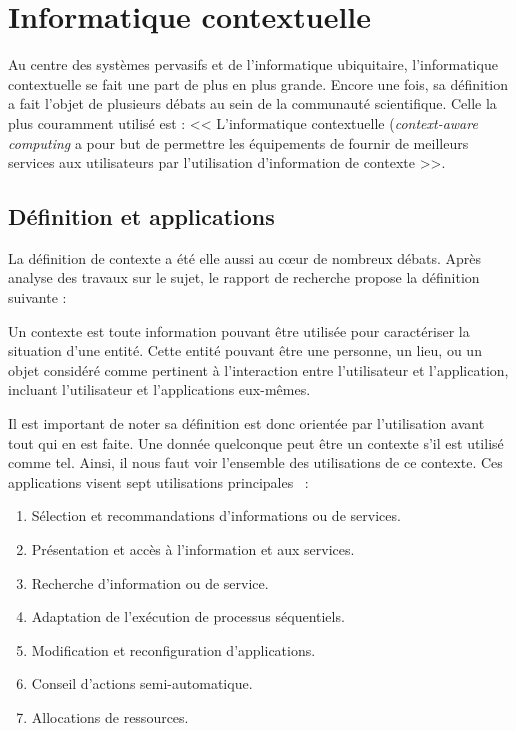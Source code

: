 \section{Informatique contextuelle}
Au centre des systèmes pervasifs et de l'informatique ubiquitaire, l'informatique contextuelle se fait une part de plus en plus grande. Encore une fois, sa définition a fait l'objet de plusieurs débats au sein de la communauté scientifique. Celle la plus couramment utilisé est : << L'informatique contextuelle (\textit{context-aware computing} a pour but de permettre les équipements de fournir de meilleurs services aux utilisateurs par l'utilisation d'information de contexte >>\cite{Han:contextaware}.

\subsection{Définition et applications}
La définition de contexte a été elle aussi au cœur de nombreux débats. Après analyse des travaux sur le sujet, le rapport de recherche \cite{Dey:context} propose la définition suivante :

\begin{defi}[Contexte]
Un contexte est toute information pouvant être utilisée pour caractériser la situation d'une entité. Cette entité pouvant être une personne, un lieu, ou un objet considéré comme pertinent à l'interaction entre l'utilisateur et l'application, incluant l'utilisateur et l'applications eux-mêmes.
\end{defi}

Il est important de noter sa définition est donc orientée par l'utilisation avant tout qui en est faite. Une donnée quelconque peut être un contexte s'il est utilisé comme tel. Ainsi, il nous faut voir l'ensemble des utilisations de ce contexte. Ces applications visent sept utilisations principales~\cite{Soylu:context} : 
\begin{enumerate}
	\item Sélection et recommandations d'informations ou de services.
	\item Présentation et accès à l'information et aux services.
	\item Recherche d'information ou de service.
	\item Adaptation de l'exécution de processus séquentiels.
	\item Modification et reconfiguration d'applications.
	\item Conseil d'actions semi-automatique.
	\item Allocations de ressources.
\end{enumerate}

